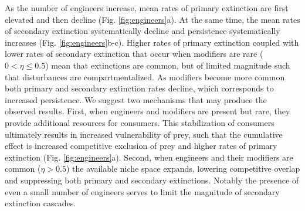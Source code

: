 \documentclass[twocolumn,preprintnumbers,amsmath,amssymb,superscriptaddress,linenumbers]{revtex4-1}
\begin{document}
As the number of engineers increase, mean rates of primary extinction are first elevated and then decline (Fig. \ref{fig:engineers}a).
At the same time, the mean rates of secondary extinction systematically decline and persistence systematically increases (Fig. \ref{fig:engineers}b-c).
Higher rates of primary extinction coupled with lower rates of secondary extinction that occur when modifiers are rare ($0 < \eta \leq 0.5$) mean that extinctions are common, but of limited magnitude such that disturbances are compartmentalized.
As modifiers become more common both primary and secondary extinction rates decline, which corresponds to increased persistence.
We suggest two mechanisms that may produce the observed results.
First, when engineers and modifiers are present but rare, they provide additional resources for consumers.
This stabilization of consumers ultimately results in increased vulnerability of prey, such that the cumulative effect is increased competitive exclusion of prey and higher rates of primary extinction (Fig. \ref{fig:engineers}a).
Second, when engineers and their modifiers are common ($\eta > 0.5$) the available niche space expands, lowering competitive overlap and suppressing both primary and secondary extinctions.
Notably the presence of even a small number of engineers serves to limit the magnitude of secondary extinction cascades.

\end{document}
